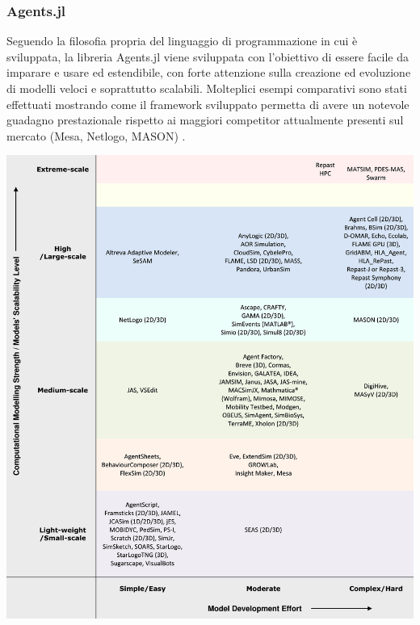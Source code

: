 \subsubsection{Agents.jl}


Seguendo la filosofia propria del linguaggio di programmazione 
in cui è sviluppata, la libreria Agents.jl \cite{Agents.jl} 
viene sviluppata con l’obiettivo di essere facile da imparare e 
usare ed estendibile, con forte attenzione sulla creazione ed 
evoluzione di modelli veloci e soprattutto scalabili. 
Molteplici esempi comparativi sono stati effettuati mostrando 
come il framework sviluppato permetta di avere un notevole 
guadagno prestazionale rispetto ai maggiori competitor 
attualmente presenti sul mercato (Mesa, Netlogo, MASON) 
\cite{ABAR201713}.

\begin{minipage}{\linewidth}
    \centering
    \includegraphics[width=\textwidth]{img/1-s2.0-S1574013716301198-gr1_lrg.jpg}
    \label{fig:Comparative_table}
\end{minipage}

